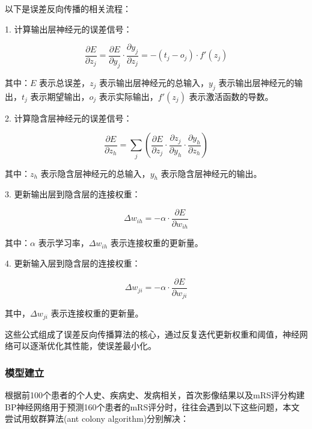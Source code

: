 \documentclass[bwprint]{gmcmthesis}
\begin{document}
以下是误差反向传播的相关流程：

1. 计算输出层神经元的误差信号：

\begin{equation}
\frac{\partial E}{\partial z_j} = \frac{\partial E}{\partial y_j} \cdot \frac{\partial y_j}{\partial z_j} = -(t_j - o_j) \cdot f'(z_j)
\end{equation}

\noindent 其中：$E$ 表示总误差，$z_j$ 表示输出层神经元的总输入，$y_j$ 表示输出层神经元的输出，$t_j$ 表示期望输出，$o_j$ 表示实际输出，$f'(z_j)$ 表示激活函数的导数。

2. 计算隐含层神经元的误差信号：

\begin{equation}
\frac{\partial E}{\partial z_h} = \sum_{j} \left( \frac{\partial E}{\partial z_j} \cdot \frac{\partial z_j}{\partial y_h} \cdot \frac{\partial y_h}{\partial z_h} \right)
\end{equation}

\noindent 其中：$z_h$ 表示隐含层神经元的总输入，$y_h$ 表示隐含层神经元的输出。

3. 更新输出层到隐含层的连接权重：

\begin{equation}
\Delta w_{ih} = -\alpha \cdot \frac{\partial E}{\partial w_{ih}}
\end{equation}

\noindent 其中：$\alpha$ 表示学习率，$\Delta w_{ih}$ 表示连接权重的更新量。

4. 更新输入层到隐含层的连接权重：

\begin{equation}
\Delta w_{ji} = -\alpha \cdot \frac{\partial E}{\partial w_{ji}}
\end{equation}

\noindent 其中，$\Delta w_{ji}$ 表示连接权重的更新量。

这些公式组成了误差反向传播算法的核心，通过反复迭代更新权重和阈值，神经网络可以逐渐优化其性能，使误差最小化。





\subsubsection{模型建立}\label{IACO-BP}

根据前100个患者的个人史、疾病史、发病相关，首次影像结果以及mRS评分构建BP神经网络用于预测160个患者的mRS评分时，往往会遇到以下这些问题，本文尝试用蚁群算法(ant colony algorithm)\cite{ACO}分别解决：
\end{document}
